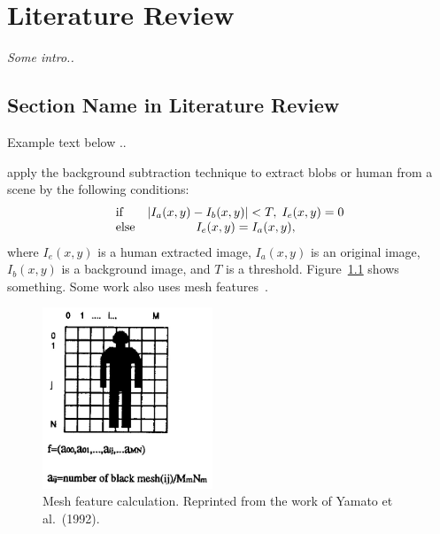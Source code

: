 \setlength{\footskip}{8mm}

\chapter{Literature Review} 
\label{ch:literature-review}

\textit{Some intro..}

\section{Section Name in Literature Review}
\label{section-name-in-literature-review}

Example text below ..

 apply the background subtraction 
technique to extract blobs or human from a scene by the 
following conditions:
\[
\begin{array}{lc}
  {\rm if} & \left|{I_a (x,y) - I_b (x,y)}\right|< T,\;I_e (x,y) = 0 \\ 
  {\rm else} & I_e (x,y) = I_a (x,y), 
\end{array}
\]
where $I_e (x,y)$ is a human extracted image, $I_a (x,y)$ is an
original image, $I_b (x,y)$ is a background image, and $T$ is a
threshold. Figure~\ref{fig:mesh-feature} shows something. Some work also uses 
mesh features~.


\begin{figure}[t]
  \centering
  \includegraphics[width=2in]{figures/mesh-feature.jpg}  
  \caption[Mesh feature calculation]{Mesh feature
    calculation. Reprinted from the work of Yamato et al.\ (1992).}
  \label{fig:mesh-feature}
\end{figure}

\FloatBarrier

